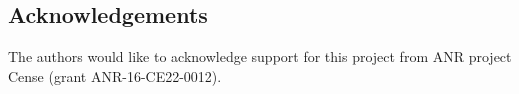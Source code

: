 \documentclass[a0,portrait]{a0poster}
\begin{document}
\begin{multicols}{2}

\nocite{*} %


\section*{Acknowledgements}

The authors would like to acknowledge support for this project from ANR project Cense (grant ANR-16-CE22-0012).

\end{multicols}
\end{document}
